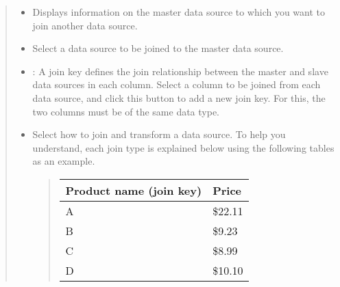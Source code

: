 \documentclass[letterpaper,10pt,english]{sphinxmanual}
\begin{document}
\begin{enumerate}
\begin{quote}
\begin{figure}[H]
\noindent{}
\end{figure}
\begin{itemize}
\item {} 
 Displays information on the master data source to which you want to join another data source.

\item {} 
 Select a data source to be joined to the master data source.

\item {} 
: A join key defines the join relationship between the master and slave data sources in each column. Select a column to be joined from each data source, and click this button to add a new join key. For this, the two columns must be of the same data type.

\item {} 
 Select how to join and transform a data source. To help you understand, each join type is explained below using the following tables as an example.
\begin{quote}


\begin{savenotes}\sphinxattablestart
\centering
{}
\sphinxthecaptionisattop
{}\label{\detokenize{discovery/part04/create_a_dashboard:master-data-source}}
\sphinxaftertopcaption
\begin{tabulary}{\linewidth}[t]{|T|T|}
\hline
\sphinxstyletheadfamily 
Product name (join key)
&\sphinxstyletheadfamily 
Price
\\
\hline
A
&
\$22.11
\\
\hline
B
&
\$9.23
\\
\hline
C
&
\$8.99
\\
\hline
D
&
\$10.10
\\
\hline
\end{tabulary}
\par
\sphinxattableend\end{savenotes}



\end{quote}
\end{itemize}
\end{quote}
\end{enumerate}
\end{document}
